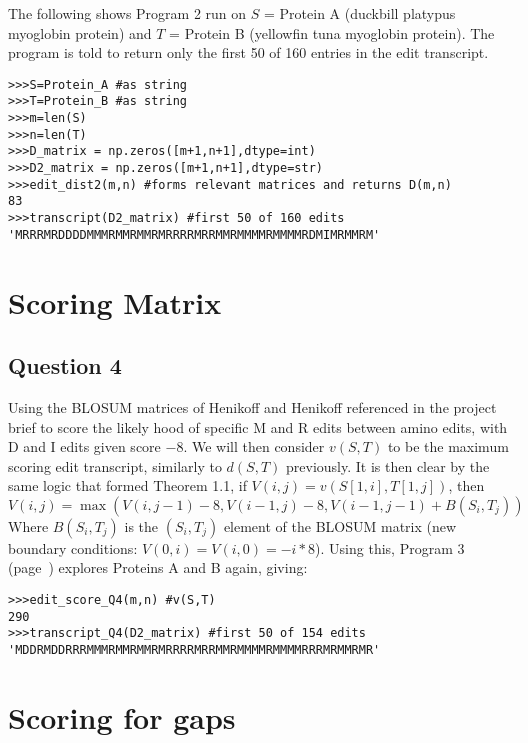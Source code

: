 \documentclass{article}
\begin{document}
The following shows Program 2 run on $S$ = Protein A (duckbill platypus myoglobin protein) and $T$ = Protein B (yellowfin tuna myoglobin protein). The program is told to return only the first 50 of 160 entries in the edit transcript.
\begin{lstlisting}
>>>S=Protein_A #as string
>>>T=Protein_B #as string
>>>m=len(S)
>>>n=len(T)
>>>D_matrix = np.zeros([m+1,n+1],dtype=int)
>>>D2_matrix = np.zeros([m+1,n+1],dtype=str)
>>>edit_dist2(m,n) #forms relevant matrices and returns D(m,n)
83
>>>transcript(D2_matrix) #first 50 of 160 edits
'MRRRMRDDDDMMMRMMRMMRMRRRRMRRMMRMMMMRMMMMRDMIMRMMRM'
\end{lstlisting}
\vspace{-0.5cm}

\section{Scoring Matrix}
\vspace{-0.3cm}

\subsection{Question 4}
\vspace{-0.3cm}
Using the BLOSUM matrices of Henikoff and Henikoff referenced in the project brief to score the likely hood of specific M and R edits between amino edits, with D and I edits given score $-8$. We will then consider $v(S,T)$ to be the maximum scoring edit transcript, similarly to $d(S,T)$ previously. It is then clear by the same logic that formed Theorem 1.1, if $V(i,j)=v(S[1,i],T[1,j])$, then
\begin{equation}
V(i,j) = \max(V(i,j-1)-8,V(i-1,j)-8,V(i-1,j-1)+B(S_i,T_j))
\end{equation}
Where $B(S_i,T_j)$ is the $(S_i,T_j)$ element of the BLOSUM matrix (new boundary conditions: $V(0,i)=V(i,0)=-i*8$). Using this, Program 3 (page~\pageref{subsec:Program 3}) explores Proteins A and B again, giving:

\begin{lstlisting}
>>>edit_score_Q4(m,n) #v(S,T)
290
>>>transcript_Q4(D2_matrix) #first 50 of 154 edits
'MDDRMDDRRRMMMRMMRMMRMRRRRMRRMMRMMMMRMMMMRRRMRMMRMR'
\end{lstlisting}
\vspace{-0.5cm}

\section{Scoring for gaps}
\vspace{-0.3cm}
\end{document}
